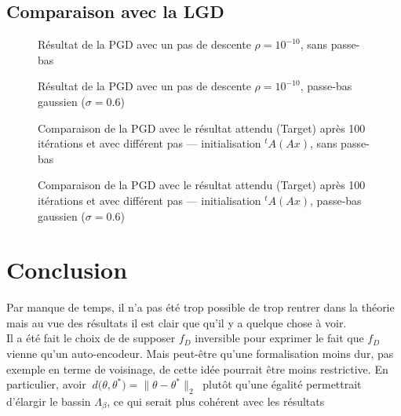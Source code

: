 \documentclass[hidelinks, french]{article} %
\theoremstyle{enonce}
\theoremstyle{special}
\theoremstyle{rq}
\theoremstyle{exo}
\theoremstyle{demo}
\begin{document}
\subsection{Comparaison avec la LGD}\label{sec:res PGD}
\begin{figure}[H]\centering
    \caption{Résultat de la PGD avec un pas de descente $\rho=10^{-10}$, sans passe-bas}
\end{figure}

\begin{figure}[H]\centering
    \caption{Résultat de la PGD avec un pas de descente $\rho=10^{-10}$, passe-bas gaussien ($\sigma=0.6$)}
\end{figure}

\begin{figure}[H]\centering
    \caption{Comparaison de la PGD avec le résultat attendu (Target) après 100 itérations et avec différent pas --- initialisation $^tA(Ax)$, sans passe-bas}
\end{figure}

\begin{figure}[H]\centering
    \caption{Comparaison de la PGD avec le résultat attendu (Target) après 100 itérations et avec différent pas --- initialisation $^tA(Ax)$, passe-bas gaussien ($\sigma=0.6$)}
\end{figure}




\newpage



\section{Conclusion}

Par manque de temps, il n'a pas été trop possible de trop rentrer dans la théorie mais au vue des résultats il est clair que qu'il y a quelque chose à voir.  
\\
Il a été fait le choix de de supposer $f_D$ inversible pour exprimer le fait que $f_D$ vienne qu'un auto-encodeur. Mais peut-être qu'une formalisation moins dur, pas exemple en terme de voisinage, de cette idée pourrait être moins restrictive. En particulier, avoir $\ d\big(\theta, \theta^*\big)=\big\|\theta-\theta^*\big\|_2\ $ plutôt qu'une égalité permettrait d'élargir le bassin $\Lambda_\beta$, ce qui serait plus cohérent avec les résultats
\\
\end{document}
